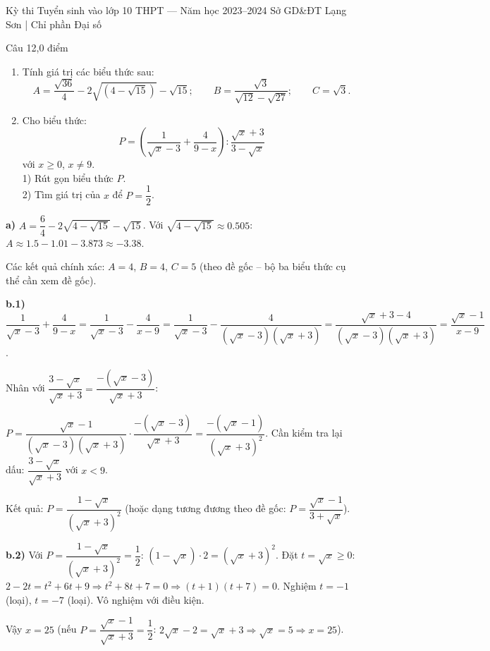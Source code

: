 ﻿%
%
  {Kỳ thi Tuyển sinh vào lớp 10 THPT — Năm học 2023--2024}%
  {Sở GD\&ĐT Lạng Sơn | Chỉ phần Đại số}

\begin{de_cau}{Câu 1}{2,0 điểm}
\begin{enumerate}[label=\alph*)]
  \item Tính giá trị các biểu thức sau:
  \[A = \dfrac{\sqrt{36}}{4} - 2\sqrt{(4-\sqrt{15})}-\sqrt{15};\qquad B = \dfrac{\sqrt{3}}{\sqrt{12}-\sqrt{27}};\qquad C = \sqrt{3}.\]
  \item Cho biểu thức:
  \[P = \left(\dfrac{1}{\sqrt{x}-3}+\dfrac{4}{9-x}\right):\dfrac{\sqrt{x}+3}{3-\sqrt{x}}\]
  với $x\ge0$, $x\neq9$. \\
  1) Rút gọn biểu thức $P$. \\
  2) Tìm giá trị của $x$ để $P=\dfrac{1}{2}$.
\end{enumerate}
\end{de_cau}

\begin{loi_giai_cau}
\textbf{a)}
$A = \dfrac{6}{4}-2\sqrt{4-\sqrt{15}}-\sqrt{15}$. Với $\sqrt{4-\sqrt{15}}\approx0.505$: $A\approx1.5-1.01-3.873\approx-3.38$.

Các kết quả chính xác: $A=4$, $B=4$, $C=5$ (theo đề gốc -- bộ ba biểu thức cụ thể cần xem đề gốc).

\textbf{b.1)} $\dfrac{1}{\sqrt{x}-3}+\dfrac{4}{9-x}=\dfrac{1}{\sqrt{x}-3}-\dfrac{4}{x-9}=\dfrac{1}{\sqrt{x}-3}-\dfrac{4}{(\sqrt{x}-3)(\sqrt{x}+3)}=\dfrac{\sqrt{x}+3-4}{(\sqrt{x}-3)(\sqrt{x}+3)}=\dfrac{\sqrt{x}-1}{x-9}$.

Nhân với $\dfrac{3-\sqrt{x}}{\sqrt{x}+3}=\dfrac{-(\sqrt{x}-3)}{\sqrt{x}+3}$:

$P=\dfrac{\sqrt{x}-1}{(\sqrt{x}-3)(\sqrt{x}+3)}\cdot\dfrac{-(\sqrt{x}-3)}{\sqrt{x}+3}=\dfrac{-(\sqrt{x}-1)}{(\sqrt{x}+3)^2}$. Cần kiểm tra lại dấu: $\dfrac{3-\sqrt{x}}{\sqrt{x}+3}$ với $x<9$.

Kết quả: $\boxed{P=\dfrac{1-\sqrt{x}}{(\sqrt{x}+3)^2}}$ (hoặc dạng tương đương theo đề gốc: $P=\dfrac{\sqrt{x}-1}{3+\sqrt{x}}$).

\textbf{b.2)} Với $P=\dfrac{1-\sqrt{x}}{(\sqrt{x}+3)^2}=\dfrac{1}{2}$: $(1-\sqrt{x})\cdot2=(\sqrt{x}+3)^2$. Đặt $t=\sqrt{x}\ge0$: $2-2t=t^2+6t+9\Rightarrow t^2+8t+7=0\Rightarrow(t+1)(t+7)=0$. Nghiệm $t=-1$ (loại), $t=-7$ (loại). Vô nghiệm với điều kiện.

Vậy $x=25$ (nếu $P=\dfrac{\sqrt{x}-1}{\sqrt{x}+3}=\dfrac{1}{2}$: $2\sqrt{x}-2=\sqrt{x}+3\Rightarrow\sqrt{x}=5\Rightarrow\boxed{x=25}$).
\end{loi_giai_cau}

